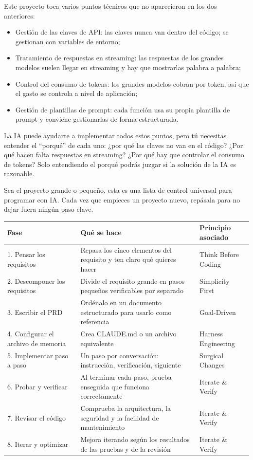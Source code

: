 
Este proyecto toca varios puntos técnicos que no aparecieron en los dos anteriores:

\begin{itemize}
  \item Gestión de las claves de API: las claves nunca van dentro del código; se gestionan con variables de entorno;
  \item Tratamiento de respuestas en streaming: las respuestas de los grandes modelos suelen llegar en streaming y hay que mostrarlas palabra a palabra;
  \item Control del consumo de tokens: los grandes modelos cobran por token, así que el gasto se controla a nivel de aplicación;
  \item Gestión de plantillas de prompt: cada función usa su propia plantilla de prompt y conviene gestionarlas de forma estructurada.
\end{itemize}

La IA puede ayudarte a implementar todos estos puntos, pero tú necesitas entender el “porqué” de cada uno: ¿por qué las claves no van en el código? ¿Por qué hacen falta respuestas en streaming? ¿Por qué hay que controlar el consumo de tokens? Solo entendiendo el porqué podrás juzgar si la solución de la IA es razonable.


Sea el proyecto grande o pequeño, esta es una lista de control universal para programar con IA. Cada vez que empieces un proyecto nuevo, repásala para no dejar fuera ningún paso clave.

\begin{center}
\begin{tabularx}{\linewidth}{|X|X|X|}
\hline
\textbf{Fase} & \textbf{Qué se hace} & \textbf{Principio asociado} \tabularnewline
\hline
1. Pensar los requisitos & Repasa los cinco elementos del requisito y ten claro qué quieres hacer & Think Before Coding \tabularnewline
2. Descomponer los requisitos & Divide el requisito grande en pasos pequeños verificables por separado & Simplicity First \tabularnewline
3. Escribir el PRD & Ordénalo en un documento estructurado para usarlo como referencia & Goal-Driven \tabularnewline
4. Configurar el archivo de memoria & Crea CLAUDE.md o un archivo equivalente & Harness Engineering \tabularnewline
5. Implementar paso a paso & Un paso por conversación: instrucción, verificación, siguiente & Surgical Changes \tabularnewline
6. Probar y verificar & Al terminar cada paso, prueba enseguida que funciona correctamente & Iterate \& Verify \tabularnewline
7. Revisar el código & Comprueba la arquitectura, la seguridad y la facilidad de mantenimiento & Iterate \& Verify \tabularnewline
8. Iterar y optimizar & Mejora iterando según los resultados de las pruebas y de la revisión & Iterate \& Verify \tabularnewline
\hline
\end{tabularx}
\end{center}

